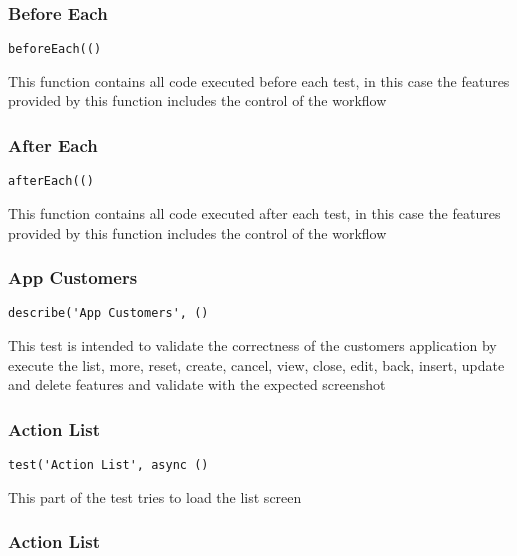 \documentclass[a4paper]{article}
\begin{document}
\subsubsection{Before Each}

\begin{lstlisting}
beforeEach(()
\end{lstlisting}

This function contains all code executed before each test, in this case the
features provided by this function includes the control of the workflow

\hypertarget{toc115}{}
\subsubsection{After Each}

\begin{lstlisting}
afterEach(()
\end{lstlisting}

This function contains all code executed after each test, in this case the
features provided by this function includes the control of the workflow

\hypertarget{toc116}{}
\subsubsection{App Customers}

\begin{lstlisting}
describe('App Customers', ()
\end{lstlisting}

This test is intended to validate the correctness of the customers application
by execute the list, more, reset, create, cancel, view, close, edit, back,
insert, update and delete features and validate with the expected screenshot

\hypertarget{toc117}{}
\subsubsection{Action List}

\begin{lstlisting}
test('Action List', async ()
\end{lstlisting}

This part of the test tries to load the list screen

\hypertarget{toc118}{}
\subsubsection{Action List}
\end{document}
